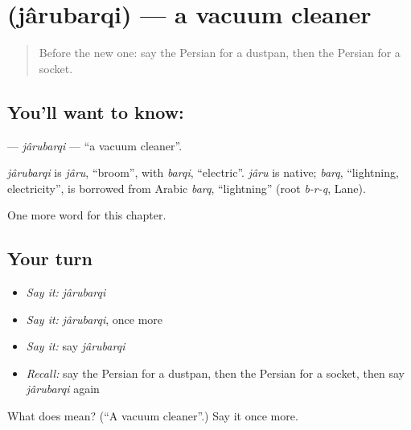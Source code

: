 \section[\texorpdfstring{\fa{جاروبرقی} (jârubarqi)}{جاروبرقی (jârubarqi)}]{ (jârubarqi) — a vacuum cleaner}

\label{lesson:FA-C175-jarubarqi}



\begin{quote}
Before the new one: say the Persian for a dustpan, then the Persian for a socket.
\end{quote}

\subsection*{You'll want to know: }
\textbf{} — \emph{jârubarqi} — \textquotedblleft{}a vacuum cleaner\textquotedblright{}.

\begin{cousinweb}
\emph{jârubarqi} is \emph{jâru}, \textquotedblleft{}broom\textquotedblright{}, with \emph{barqi}, \textquotedblleft{}electric\textquotedblright{}. \emph{jâru} is native; \emph{barq}, \textquotedblleft{}lightning, electricity\textquotedblright{}, is borrowed from Arabic \emph{barq}, \textquotedblleft{}lightning\textquotedblright{} (root \emph{b-r-q}, Lane).
\end{cousinweb}

\begin{grammarlens}[title={What you've built}]
One more word for this chapter.
\end{grammarlens}

\subsection*{Your turn}
\begin{itemize}
\raggedright
  \item \emph{Say it:} \emph{jârubarqi}
  \item \emph{Say it:} \emph{jârubarqi}, once more
  \item \emph{Say it:} say \emph{jârubarqi}
  \item \emph{Recall:} say the Persian for a dustpan, then the Persian for a socket, then say \emph{jârubarqi} again
\end{itemize}

\begin{tcolorbox}[breakable,colback=teal!4,colframe=teal!35!black,title={Before you move on}]
What does  mean? (\textquotedblleft{}A vacuum cleaner\textquotedblright{}.) Say it once more.
\end{tcolorbox}
